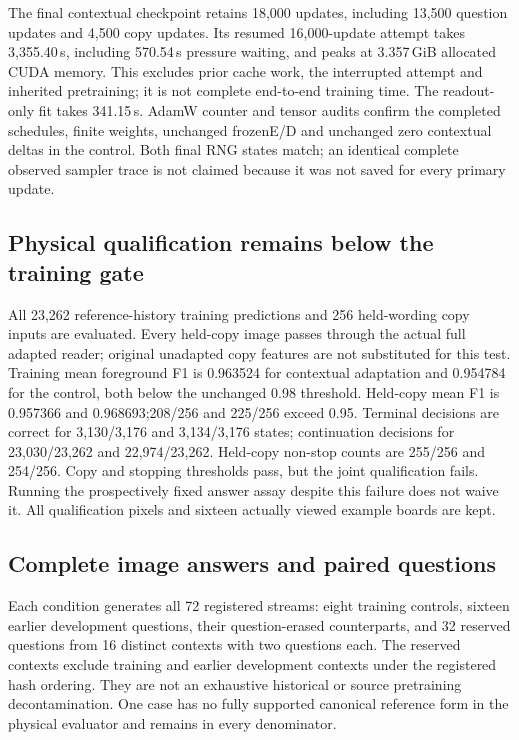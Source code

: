 \documentclass[10pt,a4paper]{article}
\providecommand{\DIFadd}[1]{{\protect\color{blue} \sf #1}} %
\begin{document}
\DIFadd{The final contextual checkpoint retains 18,000 updates, including 13,500
question updates and 4,500 copy updates. Its resumed 16,000-update attempt takes
3,355.40\,s, including 570.54\,s pressure waiting, and peaks at 3.357\,GiB allocated
CUDA memory. This excludes prior cache work, the interrupted attempt and
inherited pretraining; it is not complete end-to-end training time. The
readout-only fit takes 341.15\,s. AdamW counter and tensor audits confirm the
completed schedules, finite weights, unchanged frozenE/D and unchanged zero
contextual deltas in the control. Both final RNG states match; an identical
complete observed sampler trace is not claimed because it was not saved for
every primary update.
}

\subsection*{\DIFadd{Physical qualification remains below the training gate}}
\DIFadd{All 23,262 reference-history training predictions and 256 held-wording copy
inputs are evaluated. Every held-copy image passes through the actual full
adapted reader; original unadapted copy features are not substituted for this
test. Training mean foreground F1 is 0.963524 for contextual adaptation and
0.954784 for the control, both below the unchanged 0.98 threshold. Held-copy
mean F1 is 0.957366 and 0.968693;208/256 and 225/256 exceed 0.95. Terminal decisions
are correct for 3,130/3,176 and 3,134/3,176 states; continuation decisions for
23,030/23,262 and 22,974/23,262. Held-copy non-stop counts are 255/256 and 254/256.
Copy and stopping thresholds pass, but the joint qualification fails. Running
the prospectively fixed answer assay despite this failure does not waive it.
All qualification pixels and sixteen actually viewed example boards are kept.
}

\subsection*{\DIFadd{Complete image answers and paired questions}}
\DIFadd{Each condition generates all 72 registered streams: eight training controls,
sixteen earlier development questions, their question-erased counterparts,
and 32 reserved questions from 16 distinct contexts with two questions each.
The reserved contexts exclude training and earlier development contexts under
the registered hash ordering. They are not an exhaustive historical or source
pretraining decontamination. One case has no fully supported canonical
reference form in the physical evaluator and remains in every denominator.
}
\end{document}
